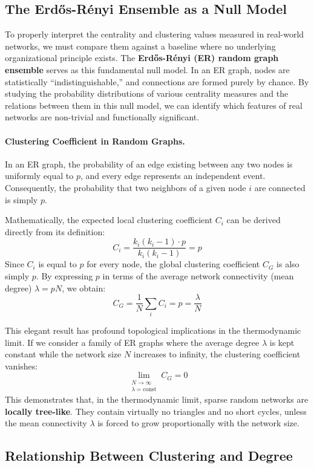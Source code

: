 \subsection{The Erdős-Rényi Ensemble as a Null Model}

To properly interpret the centrality and clustering values measured in real-world networks, we must compare them against a baseline where no underlying organizational principle exists. The \textbf{Erdős-Rényi (ER) random graph ensemble} serves as this fundamental null model. In an ER graph, nodes are statistically ``indistinguishable,'' and connections are formed purely by chance. By studying the probability distributions of various centrality measures and the relations between them in this null model, we can identify which features of real networks are non-trivial and functionally significant.

\paragraph{Clustering Coefficient in Random Graphs.}
In an ER graph, the probability of an edge existing between any two nodes is uniformly equal to $p$, and every edge represents an independent event. Consequently, the probability that two neighbors of a given node $i$ are connected is simply $p$.

Mathematically, the expected local clustering coefficient $C_i$ can be derived directly from its definition:
\[ C_i = \frac{k_i(k_i - 1) \cdot p}{k_i(k_i - 1)} = p \]
Since $C_i$ is equal to $p$ for every node, the global clustering coefficient $C_G$ is also simply $p$. By expressing $p$ in terms of the average network connectivity (mean degree) $\lambda = pN$, we obtain:
\[ C_G = \frac{1}{N} \sum_i C_i = p = \frac{\lambda}{N} \]

This elegant result has profound topological implications in the thermodynamic limit. If we consider a family of ER graphs where the average degree $\lambda$ is kept constant while the network size $N$ increases to infinity, the clustering coefficient vanishes:
\[ \lim_{\substack{N \to \infty \\ \lambda = \text{const}}} C_G = 0 \]
This demonstrates that, in the thermodynamic limit, sparse random networks are \textbf{locally tree-like}. They contain virtually no triangles and no short cycles, unless the mean connectivity $\lambda$ is forced to grow proportionally with the network size.

\subsection{Relationship Between Clustering and Degree}

